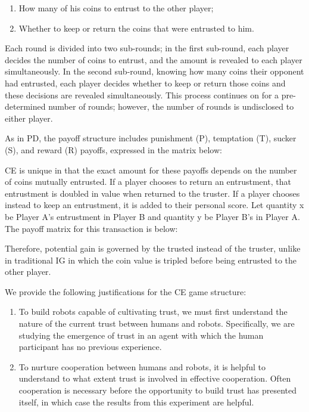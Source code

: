 \documentclass{sig-alternate}
\begin{document}
\begin{enumerate}
\item How many of his coins to entrust to the other player;
\item Whether to keep or return the coins that were entrusted to him.
\end{enumerate}

Each round is divided into two sub-rounds; in the first sub-round, each player decides the number of coins to entrust, and the amount is revealed to each player simultaneously. In the second sub-round, knowing how many coins their opponent had entrusted, each player decides whether to keep or return those coins and these decisions are revealed simultaneously. This process continues on for a pre-determined number of rounds; however, the number of rounds is undisclosed to either player. 

As in PD, the payoff structure includes punishment (P), temptation (T), sucker (S), and reward (R) payoffs, expressed in the matrix below: 

CE is unique in that the exact amount for these payoffs depends on the number of coins mutually entrusted. If a player chooses to return an entrustment, that entrustment is doubled in value when returned to the truster. If a player chooses instead to keep an entrustment, it is added to their personal score. Let quantity x be Player A's entrustment in Player B and quantity y be Player B's in Player A. The payoff matrix for this transaction is below:

Therefore, potential gain is governed by the trusted instead of the truster, unlike in traditional IG in which the coin value is tripled before being entrusted to the other player. 

We provide the following justifications for the CE game structure:

\begin{enumerate}
\item To build robots capable of cultivating trust, we must first understand the nature of the current trust between humans and robots. Specifically, we are studying the emergence of trust in an agent with which the human participant has no previous experience.
\item To nurture cooperation between humans and robots, it is helpful to understand to what extent trust is involved in effective cooperation. Often cooperation is necessary before the opportunity to build trust has presented itself, in which case the results from this experiment are helpful.
\end{enumerate}
\end{document}
